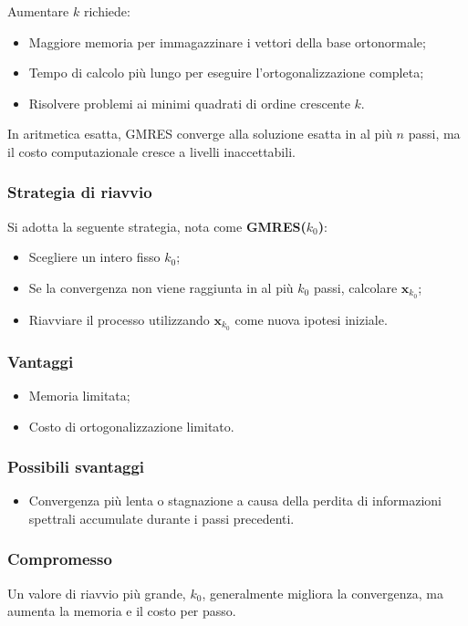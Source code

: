 Aumentare $k$ richiede:
\begin{itemize}
	\item Maggiore memoria per immagazzinare i vettori della base ortonormale;
	\item Tempo di calcolo più lungo per eseguire l'ortogonalizzazione completa;
	\item Risolvere problemi ai minimi quadrati di ordine crescente $k$.
\end{itemize}
In aritmetica esatta, GMRES converge alla soluzione esatta in al più $n$ passi, ma il costo computazionale cresce a livelli inaccettabili.

\subsubsection{Strategia di riavvio}
Si adotta la seguente strategia, nota come \textbf{GMRES($k_0$)}:
\begin{itemize}
	\item Scegliere un intero fisso $k_0$;
	\item Se la convergenza non viene raggiunta in al più $k_0$ passi, calcolare $\mathbf{x}_{k_0}$;
	\item Riavviare il processo utilizzando $\mathbf{x}_{k_0}$ come nuova ipotesi iniziale.
\end{itemize}

\subsubsection{Vantaggi}
\begin{itemize}
	\item Memoria limitata;
	\item Costo di ortogonalizzazione limitato.
\end{itemize}

\subsubsection{Possibili svantaggi}
\begin{itemize}
	\item Convergenza più lenta o stagnazione a causa della perdita di informazioni spettrali accumulate durante i passi precedenti.
\end{itemize}

\subsubsection{Compromesso}
Un valore di riavvio più grande, $k_0$, generalmente migliora la convergenza, ma aumenta la memoria e il costo per passo.

